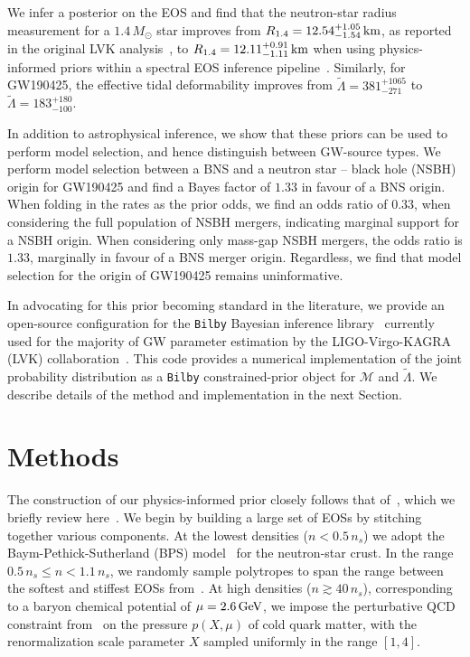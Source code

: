 \documentclass[twocolumn]{aastex631}
\begin{document}
We infer a posterior on the EOS and find that the neutron-star radius
measurement for a $1.4\,{M_\odot}$ star improves from
${R_{1.4}}=12.54^{+1.05}_{-1.54}\,{\rm km}$, as reported in the original
LVK analysis~\citep{abbott19_170817Properties}, to
${R_{1.4}}=12.11^{+0.91}_{-1.11}\,{\rm km}$ when using physics-informed
priors within a spectral EOS inference pipeline~\citep[see also][for some
  of the first estimates made after the GW170817
  event]{Most2018,Capano2020}. Similarly, for GW190425, the effective
tidal deformability improves from $\tilde{\Lambda} = 381^{+1065}_{-271}$
to $\tilde{\Lambda} = 183^{+180}_{-100}$.

In addition to astrophysical inference, we show that these priors can be
used to perform model selection, and hence distinguish between GW-source
types. We perform model selection between a BNS and a neutron star --
black hole (NSBH) origin for GW190425 and find a Bayes factor of $1.33$
in favour of a BNS origin. When folding in the rates as the prior odds,
we find an odds ratio of $0.33$, when considering the full population of
NSBH mergers, indicating marginal support for a NSBH origin.  When
considering only mass-gap NSBH mergers, the odds ratio is $1.33$,
marginally in favour of a BNS merger origin. Regardless, we find that
model selection for the origin of GW190425 remains uninformative.
	
In advocating for this prior becoming standard in the literature, we
provide an open-source configuration for the \texttt{Bilby} Bayesian
inference library~\citep{ashton19,romeroshaw20} currently used for the
majority of GW parameter estimation by the LIGO-Virgo-KAGRA (LVK)
collaboration~\citep[e.g.,][]{LIGO, Virgo, KAGRA}. This code provides a
numerical implementation of the joint probability distribution as a
\texttt{Bilby} constrained-prior object for $\mathcal{M}$ and
$\tilde{\Lambda}$. We describe details of the method and implementation
in the next Section.


\section{Methods}
\label{sec:Methods}
	
The construction of our physics-informed prior closely follows that
of~\citet{Altiparmak:2022}, which we briefly review here~\citep[see][for
  additional details]{Ecker:2022, Ecker:2022dlg}. We begin by building a
large set of EOSs by stitching together various components. At the
lowest densities ($n<0.5\,n_s$) we adopt the Baym-Pethick-Sutherland
(BPS) model~\citep{Baym71} for the neutron-star crust. In the range
$0.5\,n_s\le n < 1.1\,n_s$, we randomly sample polytropes to span the
range between the softest and stiffest EOSs
from~\citet{Hebeler:2013nza}. At high densities ($n \gtrsim 40\,n_s$),
corresponding to a baryon chemical potential of $\mu = 2.6\,\rm GeV$, we
impose the perturbative QCD constraint from~\citet{Fraga2014} on the
pressure $p(X, \mu)$ of cold quark matter, with the renormalization scale
parameter $X$ sampled uniformly in the range $[1,4]$.
	
\end{document}
